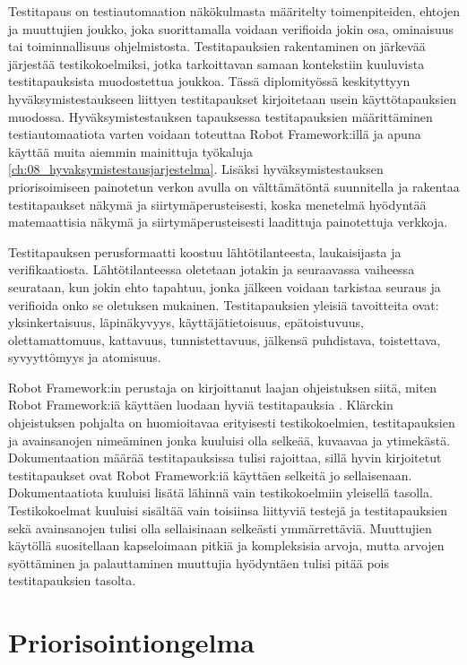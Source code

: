   Testitapaus on testiautomaation näkökulmasta määritelty toimenpiteiden, ehtojen ja muuttujien joukko, joka suorittamalla voidaan verifioida jokin osa, ominaisuus tai toiminnallisuus ohjelmistosta.
  Testitapauksien rakentaminen on järkevää järjestää testikokoelmiksi, jotka tarkoittavan samaan kontekstiin kuuluvista testitapauksista muodostettua joukkoa.
  Tässä diplomityössä keskityttyyn hyväksymistestaukseen liittyen testitapaukset kirjoitetaan usein käyttötapauksien muodossa.
  Hyväksymistestauksen tapauksessa testitapauksien määrittäminen testiautomaatiota varten voidaan toteuttaa Robot Framework:illä ja apuna käyttää muita aiemmin mainittuja työkaluja \ref{ch:08_hyvaksymistestausjarjestelma}.
  Lisäksi hyväksymistestauksen priorisoimiseen painotetun verkon avulla on välttämätöntä suunnitella ja rakentaa testitapaukset näkymä ja siirtymäperusteisesti, koska menetelmä hyödyntää matemaattisia näkymä ja siirtymäperusteisesti laadittuja painotettuja verkkoja.

  Testitapauksen perusformaatti koostuu lähtötilanteesta, laukaisijasta ja verifikaatiosta.
  Lähtötilanteessa oletetaan jotakin ja seuraavassa vaiheessa seurataan, kun jokin ehto tapahtuu, jonka jälkeen voidaan tarkistaa seuraus ja verifioida onko se oletuksen mukainen.
  Testitapauksien yleisiä tavoitteita ovat: yksinkertaisuus, läpinäkyvyys, käyttäjätietoisuus, epätoistuvuus, olettamattomuus, kattavuus, tunnistettavuus, jälkensä puhdistava, toistettava, syvyyttömyys ja atomisuus. %

  Robot Framework:in perustaja on kirjoittanut laajan ohjeistuksen siitä, miten Robot Framework:iä käyttäen luodaan hyviä testitapauksia \parencite{klarck_how-to-write-good-test-cases_2019}.
  Klärckin ohjeistuksen pohjalta on huomioitavaa erityisesti testikokoelmien, testitapauksien ja avainsanojen nimeäminen jonka kuuluisi olla selkeää, kuvaavaa ja ytimekästä.
  Dokumentaation määrää testitapauksissa tulisi rajoittaa, sillä hyvin kirjoitetut testitapaukset ovat Robot Framework:iä käyttäen selkeitä jo sellaisenaan.
  Dokumentaatiota kuuluisi lisätä lähinnä vain testikokoelmiin yleisellä tasolla.
  Testikokoelmat kuuluisi sisältää vain toisiinsa liittyviä testejä ja testitapauksien sekä avainsanojen tulisi olla sellaisinaan selkeästi ymmärrettäviä.
  Muuttujien käytöllä suositellaan kapseloimaan pitkiä ja kompleksisia arvoja, mutta arvojen syöttäminen ja palauttaminen muuttujia hyödyntäen tulisi pitää pois testitapauksien tasolta.

\section{Priorisointiongelma} \label{ch:08_priorisointiongelma}

